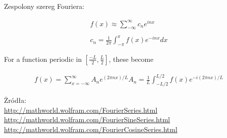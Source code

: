 \documentclass[11pt]{article}
\begin{document}
\begin{enumerate}
Zespolony szereg Fouriera:

\begin{align*}
     f(x) \approx \sum_{-\infty}^{\infty} c_{n}e^{inx} \\\\
     c_{n} = \frac{1}{2 \pi} \int_{-\pi}^{\pi} f(x) e^{-inx}dx
\end{align*}


For a function periodic in $[\frac{-L}{2},\frac{L}{2}]$, these become

\begin{align*}
    f(x) = \sum_{x= -\infty}^{\infty} A_{n}e^{(2 \pi n x)/L}
    A_{n} = \frac{1}{L}\int_{-L/2}^{L/2} f(x) e^{-i(2 \pi n x)/L}
\end{align*}


Żródła:\\
\url{http://mathworld.wolfram.com/FourierSeries.html}\\
\url{http://mathworld.wolfram.com/FourierSineSeries.html}\\
\url{http://mathworld.wolfram.com/FourierCosineSeries.html}




\end{enumerate}
\end{document}
